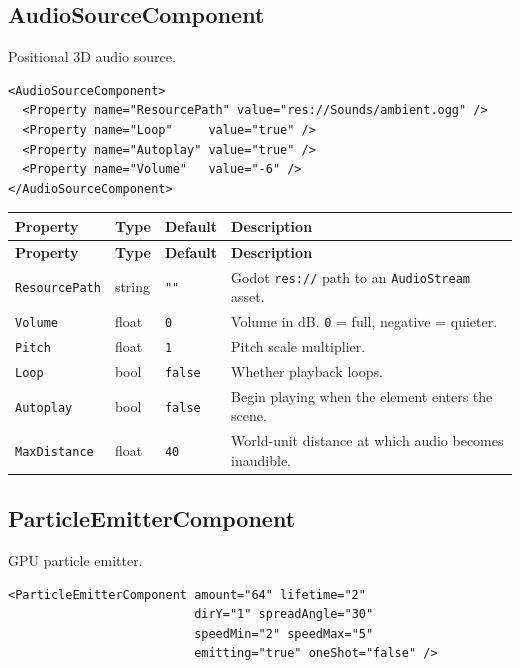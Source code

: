 \documentclass[11pt,a4paper]{article}
\begin{document}
\subsection{AudioSourceComponent}

Positional 3D audio source.

\begin{lstlisting}
<AudioSourceComponent>
  <Property name="ResourcePath" value="res://Sounds/ambient.ogg" />
  <Property name="Loop"     value="true" />
  <Property name="Autoplay" value="true" />
  <Property name="Volume"   value="-6" />
</AudioSourceComponent>
\end{lstlisting}

\begin{longtable}{P{3.2cm} P{2cm} P{2.5cm} P{5.3cm}}
  \toprule
  \textbf{Property} & \textbf{Type} & \textbf{Default} & \textbf{Description} \\
  \midrule
  \endfirsthead
  \toprule
  \textbf{Property} & \textbf{Type} & \textbf{Default} & \textbf{Description} \\
  \midrule
  \endhead
  \texttt{ResourcePath} & string & \texttt{""} &
    Godot \texttt{res://} path to an \texttt{AudioStream} asset. \\
  \texttt{Volume} & float & \texttt{0} &
    Volume in dB. \texttt{0} = full, negative = quieter. \\
  \texttt{Pitch} & float & \texttt{1} & Pitch scale multiplier. \\
  \texttt{Loop} & bool & \texttt{false} & Whether playback loops. \\
  \texttt{Autoplay} & bool & \texttt{false} & Begin playing when the element enters the scene. \\
  \texttt{MaxDistance} & float & \texttt{40} &
    World-unit distance at which audio becomes inaudible. \\
  \bottomrule
\end{longtable}

\subsection{ParticleEmitterComponent}

GPU particle emitter.

\begin{lstlisting}
<ParticleEmitterComponent amount="64" lifetime="2"
                          dirY="1" spreadAngle="30"
                          speedMin="2" speedMax="5"
                          emitting="true" oneShot="false" />
\end{lstlisting}
\end{document}
